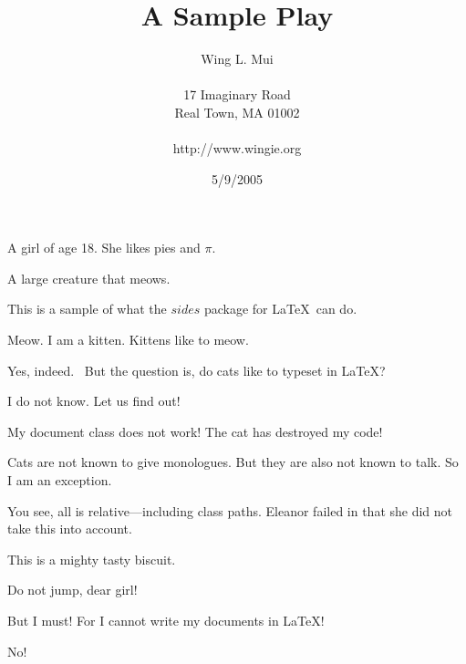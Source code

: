 \documentclass[12pt]{sides}
\title{A Sample Play}
\author{Wing L. Mui
	\\ \\
	17 Imaginary Road \\
	Real Town, MA 01002
	\\ \\
	http://www.wingie.org
}
\date{5/9/2005}
\begin{document}
\maketitle

\castpage

 A girl of age 18. She likes pies and $\pi$.

 A large creature that meows.

\notes

This is a sample of what the $sides$ package for \LaTeX\ can do.

\newact

\newscene


 Meow. I am a kitten. Kittens like to meow.

 Yes, indeed. \pause\ But the question is, do cats like to typeset in \LaTeX ?

 I do not know. Let us find out!


\newscene


  My document class does not work! The cat has destroyed my code!




 Cats are not known to give monologues. But they are also not known to talk. So I am an exception.

You see, all is relative---including class paths. Eleanor failed in that she did not take this into account.

This is a mighty tasty biscuit.


\newact



 Do not jump, dear girl!

 But I must! For I cannot write my documents in \LaTeX ! 

 No!

\end{document}
